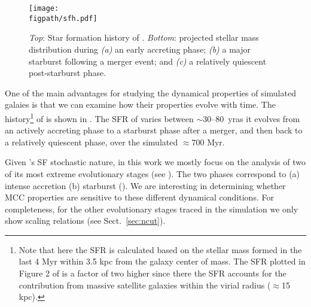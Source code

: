 \IfFileExists{emulateapjlegacy.cls}{\documentclass[iop]{emulateapjlegacy}}{\documentclass[iop]{emulateapj}}
\def\figpath{./Fig}
\begin{document}
\begin{figure*}
\centering
\texttt{[image: \\figpath/sfh.pdf]}
\caption{
    {\it Top}: Star formation history of \flower. {\it Bottom}:
    projected stellar mass distribution during {\it (a)} an early
    accreting phase;  {\it (b)} a major starburst following a merger
    event; and {\it (c)} a relatively quiescent post-starburst
    phase. 
\label{fig:SFH}}
\end{figure*}

One of the main advantages for studying the dynamical properties of simulated galaies is that we can examine how their properties evolve with time.
%
The \SF history\footnote{Note that here the SFR is calculated based on
  the stellar mass formed in the last 4 Myr within 3.5 kpc from the
  galaxy center of mass. The SFR plotted in Figure 2 of
  \citet{Pallottini17b} is a factor of two higher since there the SFR
  accounts for the contribution from massive satellite galaxies within
  the virial radius ($\approx$15\,kpc).} of \flower is shown in
. The SFR of \flower varies between $\sim$30--80 \Msun\,yr\pmOne as it evolves from an actively accreting phase to a starburst phase after a merger, and then back to a relatively quiescent phase, over the simulated $\approx 700$ Myr.

Given \flower's SF stochastic nature, in this work we mostly focus on
the analysis of two of its most extreme evolutionary stages (see
). The two phases correspond to (a) intense accretion
(b) starburst (). We are interesting in determining whether
MCC properties are sensitive to these different dynamical
conditions. For completeness, for the other evolutionary stages traced
in the simulation we only show scaling relations (see 
     Sect.~\ref{sec:ncut}).
\end{document}

